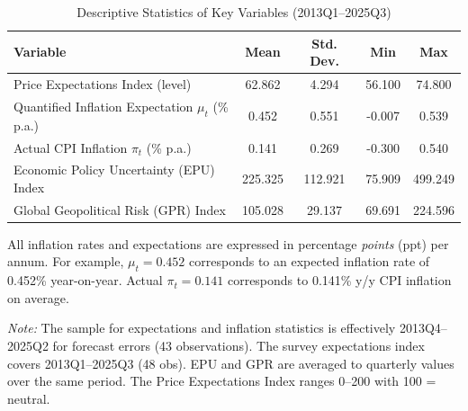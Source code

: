 \documentclass[12pt]{article}
\begin{document}
\begin{table}[!htbp]
    \centering
    \caption{Descriptive Statistics of Key Variables (2013Q1--2025Q3)}
    \label{tab:desc_stats}
    \begin{threeparttable}
        \begin{tabular}{lcccc}
            \toprule
            \textbf{Variable}                                           & \textbf{Mean} & \textbf{Std. Dev.} & \textbf{Min} & \textbf{Max} \\
            \midrule
            Price Expectations Index (level)                            & 62.862        & 4.294              & 56.100       & 74.800       \\
            Quantified Inflation Expectation $\mu_t$ (\% p.a.)\tnote{1} & 0.452         & 0.551              & -0.007       & 0.539        \\
            Actual CPI Inflation $\pi_t$ (\% p.a.)\tnote{1}             & 0.141         & 0.269              & -0.300       & 0.540        \\
            Economic Policy Uncertainty (EPU) Index                     & 225.325       & 112.921            & 75.909       & 499.249      \\
            Global Geopolitical Risk (GPR) Index                        & 105.028       & 29.137             & 69.691       & 224.596      \\
            \bottomrule
        \end{tabular}
        \begin{tablenotes}
            \footnotesize
            \item[1] All inflation rates and expectations are expressed in percentage \textit{points} (ppt) per annum. For example, $\mu_t=0.452$ corresponds to an expected inflation rate of 0.452\% year-on-year. Actual $\pi_t=0.141$ corresponds to 0.141\% y/y CPI inflation on average.
            \item \textit{Note:} The sample for expectations and inflation statistics is effectively 2013Q4--2025Q2 for forecast errors (43 observations). The survey expectations index covers 2013Q1--2025Q3 (48 obs). EPU and GPR are averaged to quarterly values over the same period. The Price Expectations Index ranges 0--200 with 100 = neutral.
        \end{tablenotes}
    \end{threeparttable}
\end{table}
\end{document}
